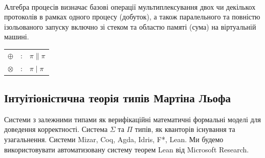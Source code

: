 \documentclass[11pt,oneside]{article}
\begin{document}
\begin{prooftree}
\end{prooftree}

\begin{prooftree}
\end{prooftree}

\begin{prooftree}
\end{prooftree}
\paragraph{}

    \paragraph{}
    Алгебра процесів визначає базові операції мультиплексування двох чи декількох
    протоколів в рамках одного процесу (добуток), а також паралельного та повністю
    ізольованого запуску включно зі стеком та областю памяті (сума) на
    віртуальній машині.

\begin{center}
\begin{tabular}{lcl}
$\oplus$   &:& $\pi \parallel \pi$\\
$\otimes$  &:& $\pi \mid \pi$\\
\end{tabular}
\end{center}

\newpage
    \subsection{Інтуітіоністична теорія типів Мартіна Льофа}
    Системи з залежними типами як верифікаційні математичні формальні моделі
    для доведення корректності. Система $\Sigma$ та $\Pi$ типів, як кванторів
    існування та узагальнення. Системи Mizar, Coq, Agda, Idris, F*, Lean. Ми будемо
    використовувати автоматизовану систему теорем Lean від Microsoft Research.
\end{document}
